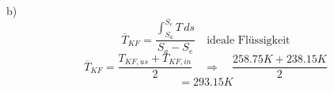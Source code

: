 b)
\[
\overline{T}_{KF} = \frac{\int_{S_a}^{S_e} T \, ds}{S_a - S_e} \quad \text{ideale Flüssigkeit}
\]
\[
\overline{T}_{KF} = \frac{T_{KF,us} + T_{KF,in}}{2} \quad \Rightarrow \quad \frac{258.75 K + 238.15 K}{2}
\]
\[
= 293.15 K
\]